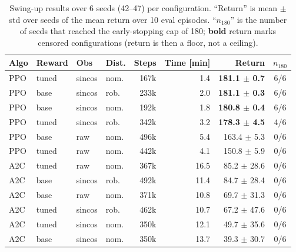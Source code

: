 \begin{table}[t]
\centering
\caption{Swing-up results over 6 seeds (42--47) per configuration. ``Return'' is mean $\pm$ std over seeds of the mean return over 10 eval episodes. ``$n_{180}$'' is the number of seeds that reached the early-stopping cap of 180; \textbf{bold} return marks censored configurations (return is then a floor, not a ceiling).}
\label{tab:exp1}
\begin{tabular}{llll rr r c}
\toprule
Algo & Reward & Obs & Dist. & Steps & Time [min] & Return & $n_{180}$ \\
\midrule
PPO & tuned & sincos & nom. & 167k & 1.4 & \textbf{181.1 $\pm$ 0.7} & 6/6 \\
PPO & base & sincos & rob. & 233k & 2.0 & \textbf{181.1 $\pm$ 0.3} & 6/6 \\
PPO & base & sincos & nom. & 192k & 1.8 & \textbf{180.8 $\pm$ 0.4} & 6/6 \\
PPO & tuned & sincos & rob. & 342k & 3.2 & \textbf{178.3 $\pm$ 4.5} & 4/6 \\
PPO & base & raw & nom. & 496k & 5.4 & 163.4 $\pm$ 5.3 & 0/6 \\
PPO & tuned & raw & nom. & 442k & 4.1 & 150.8 $\pm$ 5.9 & 0/6 \\
\midrule
A2C & tuned & raw & nom. & 367k & 16.5 & 85.2 $\pm$ 28.6 & 0/6 \\
A2C & base & sincos & rob. & 492k & 11.4 & 84.7 $\pm$ 28.4 & 0/6 \\
A2C & base & raw & nom. & 371k & 10.8 & 69.7 $\pm$ 31.3 & 0/6 \\
A2C & tuned & sincos & rob. & 462k & 10.7 & 67.2 $\pm$ 47.6 & 0/6 \\
A2C & tuned & sincos & nom. & 350k & 12.1 & 49.7 $\pm$ 35.6 & 0/6 \\
A2C & base & sincos & nom. & 350k & 13.7 & 39.3 $\pm$ 30.7 & 0/6 \\
\bottomrule
\end{tabular}
\end{table}


